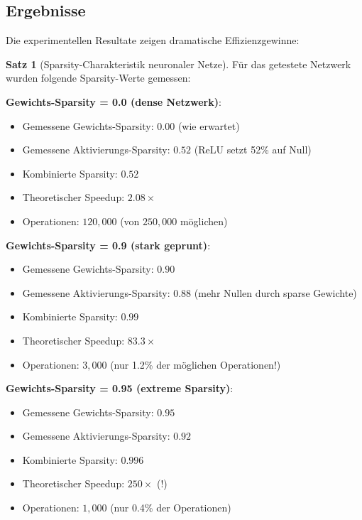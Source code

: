 \documentclass[a4paper,12pt]{report}
\theoremstyle{definition}
\newtheorem{satz}{Satz}
\begin{document}
	\subsection{Ergebnisse}
	
	Die experimentellen Resultate zeigen dramatische Effizienzgewinne:
	
	\begin{satz}[Sparsity-Charakteristik neuronaler Netze]
		Für das getestete Netzwerk wurden folgende Sparsity-Werte gemessen:
		
		\textbf{Gewichts-Sparsity = 0.0 (dense Netzwerk)}:
		\begin{itemize}
			\item Gemessene Gewichts-Sparsity: $0.00$ (wie erwartet)
			\item Gemessene Aktivierungs-Sparsity: $0.52$ (ReLU setzt 52\% auf Null)
			\item Kombinierte Sparsity: $0.52$
			\item Theoretischer Speedup: $2.08\times$
			\item Operationen: $120{,}000$ (von $250{,}000$ möglichen)
		\end{itemize}
		
		\textbf{Gewichts-Sparsity = 0.9 (stark geprunt)}:
		\begin{itemize}
			\item Gemessene Gewichts-Sparsity: $0.90$
			\item Gemessene Aktivierungs-Sparsity: $0.88$ (mehr Nullen durch sparse Gewichte)
			\item Kombinierte Sparsity: $0.99$
			\item Theoretischer Speedup: $83.3\times$
			\item Operationen: $3{,}000$ (nur 1.2\% der möglichen Operationen!)
		\end{itemize}
		
		\textbf{Gewichts-Sparsity = 0.95 (extreme Sparsity)}:
		\begin{itemize}
			\item Gemessene Gewichts-Sparsity: $0.95$
			\item Gemessene Aktivierungs-Sparsity: $0.92$
			\item Kombinierte Sparsity: $0.996$
			\item Theoretischer Speedup: $250\times$ (!)
			\item Operationen: $1{,}000$ (nur 0.4\% der Operationen)
		\end{itemize}
	\end{satz}
	
\end{document}
